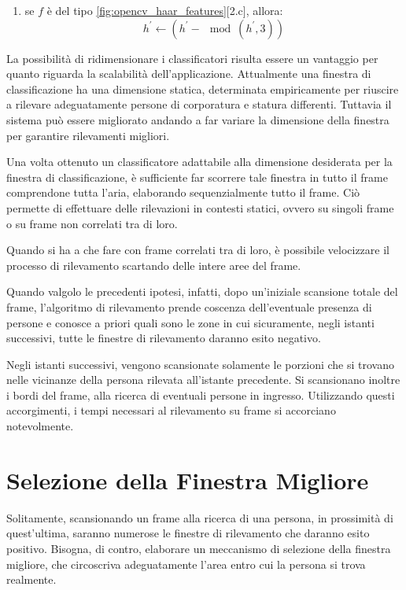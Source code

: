 \begin{enumerate}
\begin{enumerate}
\begin{enumerate}
                    \item se $f$ è del tipo \ref{fig:opencv_haar_features}[2.c], allora:
                    \begin{equation}
                        h^{'} \leftarrow (h^{'} - \mod(h^{'}, 3))
                    \end{equation}
                \end{enumerate}
             \end{enumerate} 
        \end{enumerate}

        La possibilità di ridimensionare i classificatori risulta essere un vantaggio per quanto riguarda la scalabilità dell'applicazione.
        Attualmente una finestra di classificazione ha una dimensione statica, determinata empiricamente per riuscire a rilevare adeguatamente persone di corporatura e statura differenti.
        Tuttavia il sistema può essere migliorato andando a far variare la dimensione della finestra per garantire rilevamenti migliori.

        Una volta ottenuto un classificatore adattabile alla dimensione desiderata per la finestra di classificazione, è sufficiente far scorrere tale finestra in tutto il frame comprendone tutta l'aria, elaborando sequenzialmente tutto il frame.
        Ciò permette di effettuare delle rilevazioni in contesti statici, ovvero su singoli frame o su frame non correlati tra di loro.

        Quando si ha a che fare con frame correlati tra di loro, è possibile velocizzare il processo di rilevamento scartando delle intere aree del frame.

        Quando valgolo le precedenti ipotesi, infatti, dopo un'iniziale scansione totale del frame, l'algoritmo di rilevamento prende coscenza dell'eventuale presenza di persone e conosce a priori quali sono le zone in cui sicuramente, negli istanti successivi, tutte le finestre di rilevamento daranno esito negativo.

        Negli istanti successivi, vengono scansionate solamente le porzioni che si trovano nelle vicinanze della persona rilevata all'istante precedente.
        Si scansionano inoltre i bordi del frame, alla ricerca di eventuali persone in ingresso.
        Utilizzando questi accorgimenti, i tempi necessari al rilevamento su frame si accorciano notevolmente.


    \section{Selezione della Finestra Migliore}
    \label{sec:best_detection_window}
        Solitamente, scansionando un frame alla ricerca di una persona, in prossimità di quest'ultima, saranno numerose le finestre di rilevamento che daranno esito positivo.
        Bisogna, di contro, elaborare un meccanismo di selezione della finestra migliore, che circoscriva adeguatamente l'area entro cui la persona si trova realmente.


